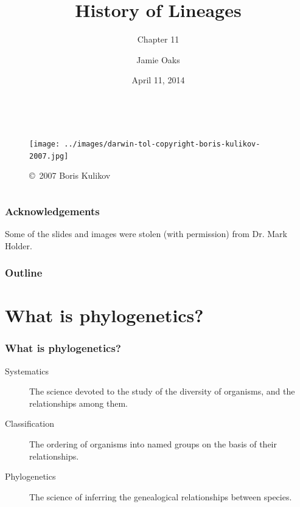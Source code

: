 



\title[History of Lineages]{History of Lineages}
\subtitle{Chapter 11}

\author[J.\ Oaks]{
    Jamie Oaks
}

\date{April 11, 2014}



\begin{frame}
    \begin{columns}[c]
            \maketitle
            \begin{figure}
                \begin{center}
                \texttt{[image: ../images/darwin-tol-copyright-boris-kulikov-2007.jpg]}
                \caption{\tiny \copyright~2007 Boris Kulikov}
                \end{center}
            \end{figure}
    \end{columns}
\end{frame}

\begin{frame}
    \frametitle{Acknowledgements}
    Some of the slides and images were stolen (with permission) from Dr. Mark Holder.
\end{frame}

\begin{frame}
\frametitle{Outline}
\tableofcontents
\end{frame}

\section{What is phylogenetics?}
\begin{frame}
    \frametitle{What is phylogenetics?}
    \begin{description}
        \item[Systematics] The science devoted to the study of the diversity of
            organisms, and the relationships among them.
        \item[Classification] The ordering of organisms into named groups on
            the basis of their relationships.
        \item[Phylogenetics] The science of inferring the genealogical
            relationships between species.
    \end{description}
\end{frame}

